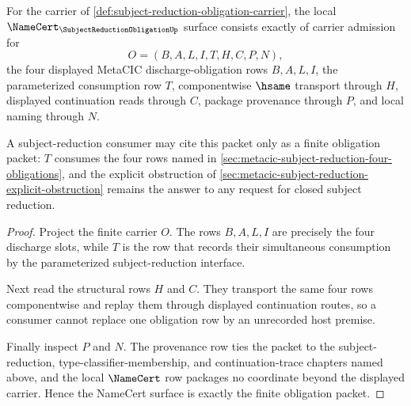 \begin{theorem}
\label{thm:subject-reduction-obligation-namecert-obligations}
For the carrier of \autoref{def:subject-reduction-obligation-carrier}, the local $\NameCert_{\SubjectReductionObligationUp}$ surface consists exactly of carrier admission for
$$
O=(B,A,L,I,T,H,C,P,N),
$$
the four displayed MetaCIC discharge-obligation rows $B,A,L,I$, the parameterized consumption row $T$, componentwise $\hsame$ transport through $H$, displayed continuation reads through $C$, package provenance through $P$, and local naming through $N$.

A subject-reduction consumer may cite this packet only as a finite obligation packet: $T$ consumes the four rows named in \autoref{sec:metacic-subject-reduction-four-obligations}, and the explicit obstruction of \autoref{sec:metacic-subject-reduction-explicit-obstruction} remains the answer to any request for closed subject reduction.
\end{theorem}
\begin{proof}
Project the finite carrier $O$. The rows $B,A,L,I$ are precisely the four discharge slots, while $T$ is the row that records their simultaneous consumption by the parameterized subject-reduction interface.

Next read the structural rows $H$ and $C$. They transport the same four rows componentwise and replay them through displayed continuation routes, so a consumer cannot replace one obligation row by an unrecorded host premise.

Finally inspect $P$ and $N$. The provenance row ties the packet to the subject-reduction, type-classifier-membership, and continuation-trace chapters named above, and the local $\NameCert$ row packages no coordinate beyond the displayed carrier. Hence the NameCert surface is exactly the finite obligation packet.
\end{proof}

